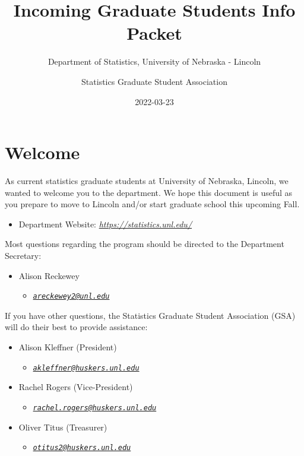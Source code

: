 \documentclass[
  12pt,
]{book}
\title{Incoming Graduate Students Info Packet}
\subtitle{Department of Statistics, University of Nebraska - Lincoln}
\author{Statistics Graduate Student Association}
\date{2022-03-23}
\providecommand{\tightlist}{%
  \setlength{\itemsep}{0pt}\setlength{\parskip}{0pt}}
\begin{document}
\maketitle

{
\setcounter{tocdepth}{1}
\tableofcontents
}
\hypertarget{welcome}{%
\chapter{Welcome}\label{welcome}}

As current statistics graduate students at University of Nebraska, Lincoln, we wanted to welcome you to the department. We hope this document is useful as you prepare to move to Lincoln and/or start graduate school this upcoming Fall.

\begin{itemize}
\tightlist
\item
  Department Website: \emph{\url{https://statistics.unl.edu/}}
\end{itemize}

Most questions regarding the program should be directed to the Department Secretary:

\begin{itemize}
\tightlist
\item
  Alison Reckewey

  \begin{itemize}
  \tightlist
  \item
    \emph{\href{mailto:areckewey2@unl.edu}{\nolinkurl{areckewey2@unl.edu}}}
  \end{itemize}
\end{itemize}

If you have other questions, the Statistics Graduate Student Association (GSA) will do their best to provide assistance:

\begin{itemize}
\tightlist
\item
  Alison Kleffner (President)

  \begin{itemize}
  \tightlist
  \item
    \emph{\href{mailto:akleffner@huskers.unl.edu}{\nolinkurl{akleffner@huskers.unl.edu}}}
  \end{itemize}
\item
  Rachel Rogers (Vice-President)

  \begin{itemize}
  \tightlist
  \item
    \emph{\href{mailto:rachel.rogers@huskers.unl.edu}{\nolinkurl{rachel.rogers@huskers.unl.edu}}}
  \end{itemize}
\item
  Oliver Titus (Treasurer)

  \begin{itemize}
  \tightlist
  \item
    \emph{\href{mailto:otitus2@huskers.unl.edu}{\nolinkurl{otitus2@huskers.unl.edu}}}
  \end{itemize}
\end{itemize}
\end{document}
